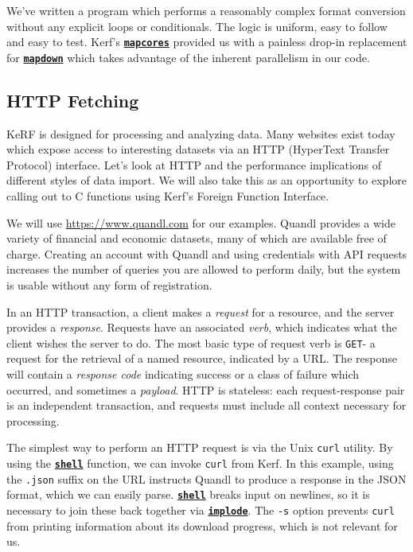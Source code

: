 \documentclass{article}
\newcommand{\primu}[2]{\hyperref[prim:#2]{\textbf{\texttt{#1}}}}
\newcommand{\prim}[1]{\primu{#1}{#1}}
\newcommand{\comb}[1]{\primu{#1}{#1}}
\begin{document}
We've written a program which performs a reasonably complex format conversion without any explicit loops or conditionals. The logic is uniform, easy to follow and easy to test. Kerf's \comb{mapcores} provided us with a painless drop-in replacement for \comb{mapdown} which takes advantage of the inherent parallelism in our code.

\pagebreak
\subsection{HTTP Fetching}
KeRF is designed for processing and analyzing data. Many websites exist today which expose access to interesting datasets via an HTTP (HyperText Transfer Protocol) interface. Let's look at HTTP and the performance implications of different styles of data import. We will also take this as an opportunity to explore calling out to C functions using Kerf's Foreign Function Interface.

\vspace{0.5cm}

We will use \url{https://www.quandl.com} for our examples. Quandl provides a wide variety of financial and economic datasets, many of which are available free of charge. Creating an account with Quandl and using credentials with API requests increases the number of queries you are allowed to perform daily, but the system is usable without any form of registration.

\vspace{0.5cm}

In an HTTP transaction, a client makes a \emph{request} for a resource, and the server provides a \emph{response}. Requests have an associated \emph{verb}, which indicates what the client wishes the server to do. The most basic type of request verb is \texttt{GET}- a request for the retrieval of a named resource, indicated by a URL. The response will contain a \emph{response code} indicating success or a class of failure which occurred, and sometimes a \emph{payload}. HTTP is stateless: each request-response pair is an independent transaction, and requests must include all context necessary for processing.

\vspace{0.5cm}

The simplest way to perform an HTTP request is via the Unix \texttt{curl} utility. By using the \prim{shell} function, we can invoke \texttt{curl} from Kerf. In this example, using the \texttt{.json} suffix on the URL instructs Quandl to produce a response in the JSON format, which we can easily parse. \prim{shell} breaks input on newlines, so it is necessary to join these back together via \prim{implode}. The \texttt{-s} option prevents \texttt{curl} from printing information about its download progress, which is not relevant for us.
\end{document}
